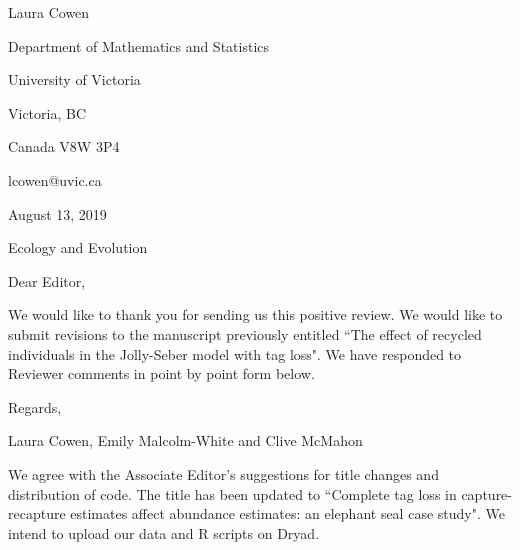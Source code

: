 \documentclass[12pt]{article}
\begin{document}
\setlength{\textheight}{575pt} \setlength{\baselineskip}{23pt}

\noindent\tiny Laura Cowen

\noindent Department of Mathematics and Statistics

\noindent University of Victoria

\noindent Victoria, BC

\noindent Canada V8W 3P4

\noindent lcowen@uvic.ca

\bigskip

\bigskip

\noindent \normalsize August 13, 2019
\bigskip





\noindent Ecology and Evolution


\bigskip


\bigskip
\noindent Dear Editor,

\bigskip

We would like to thank you for sending us this positive review.  We would like to submit revisions to the manuscript previously entitled ``The effect of recycled individuals in the Jolly-Seber model with tag loss".  We have responded to Reviewer comments in point by point form below. 

\bigskip

Regards,

\bigskip


Laura Cowen, Emily Malcolm-White and Clive McMahon


\newpage

\bigskip



We agree with the Associate Editor's suggestions for title changes and distribution of code. The title has been updated to ``Complete tag loss in capture-recapture estimates affect abundance estimates: an elephant seal case study". We intend to upload our data and R scripts on Dryad. 

\bigskip
\end{document}
